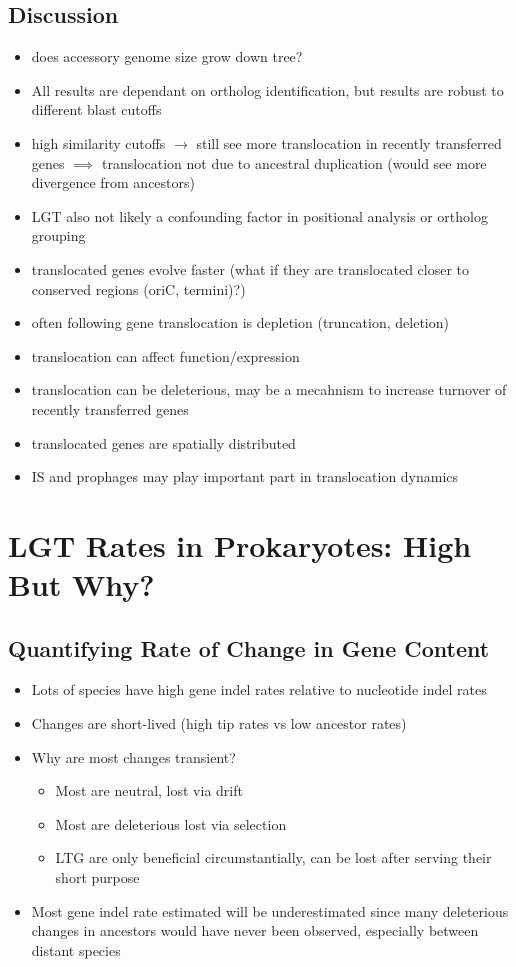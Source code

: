 \documentclass[10pt,letter]{article}
\begin{document}
\subsection*{Discussion}
\begin{itemize}
    \item does accessory genome size grow down tree?
    \item All results are dependant on ortholog identification, but results are robust to different blast cutoffs
    \item high similarity cutoffs $\to$ still see more translocation in recently transferred genes $\implies$ translocation not due to ancestral duplication (would see more divergence from ancestors)
    \item LGT also not likely a confounding factor in positional analysis or ortholog grouping
    \item translocated genes evolve faster (what if they are translocated closer to conserved regions (oriC, termini)?)
    \item often following gene translocation is depletion (truncation, deletion)
    \item translocation can affect function/expression
    \item translocation can be deleterious, may be a mecahnism to increase turnover of recently transferred genes
    \item translocated genes are spatially distributed
    \item IS and prophages may play important part in translocation dynamics
\end{itemize}
\section*{LGT Rates in Prokaryotes: High But Why?\cite{high}}
\subsection*{Quantifying Rate of Change in Gene Content}
\begin{itemize}
    \item Lots of species have high gene indel rates relative to nucleotide indel rates
    \item Changes are short-lived (high tip rates vs low ancestor rates)
    \item Why are most changes transient?
    \begin{itemize}
        \item Most are neutral, lost via drift
        \item Most are deleterious lost via selection
        \item LTG are only beneficial circumstantially, can be lost after serving their short purpose
    \end{itemize}
    \item Most gene indel rate estimated will be underestimated since many deleterious changes in ancestors would have never been observed, especially between distant species
\end{itemize}
\end{document}
